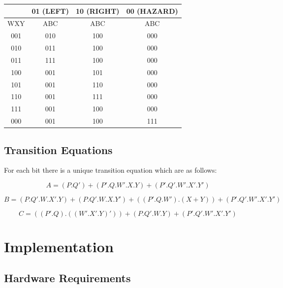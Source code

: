 \documentclass[12pt, letterpaper]{report}
\begin{document}
\begin{center}
 \begin{tabular}{||c c c c||} 
 \hline
  & 01 (LEFT) & 10 (RIGHT)  & 00 (HAZARD)  \\ [0.5ex] 
 \hline
 WXY & ABC & ABC & ABC \\ 
 \hline\hline
 001 & 010 & 100 & 000 \\ 
 \hline
 010 & 011 & 100 & 000 \\ 
 \hline
  011 & 111 & 100 & 000 \\ 
 \hline
  100 & 001 & 101 & 000 \\ 
 \hline
 101 & 001 & 110 & 000 \\ 
 \hline
 110 & 001 & 111 & 000 \\ 
 \hline
 111 & 001 & 100 & 000 \\ 
 \hline
 000 & 001 & 100 & 111 \\ 
 \hline
 \hline
 
\end{tabular}
\end{center}

\section{Transition Equations}
For each bit there is a unique transition equation which are as follows:

  \begin{equation}
  A=(P.Q')+(P'.Q.W'.X.Y)+(P'.Q'.W'.X'.Y')
  \end{equation}
 

 
  \begin{equation}
  B= (P.Q'.W.X'.Y)+(P.Q'.W.X.Y')+((P'.Q.W').(X+Y))+ (P'.Q'.W'.X'.Y')
  \end{equation}
 
  \begin{equation}
  C=((P'.Q).(( W'.X'.Y)'))+(P.Q'.W.Y)+(P'.Q'.W'.X'.Y')
  \end{equation}
  





\chapter{Implementation}

\section{Hardware Requirements}
\end{document}
